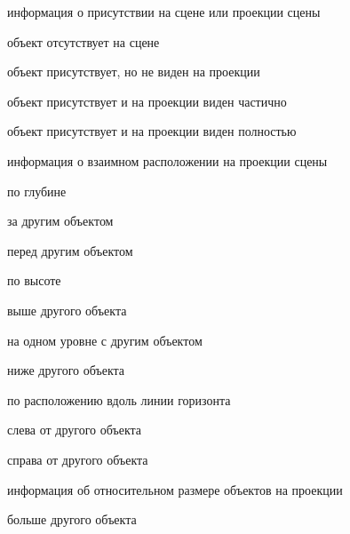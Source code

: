 \begin{textitemize}
    \item информация о присутствии на сцене или проекции сцены
    \begin{textitemize}
        \item объект отсутствует на сцене
        \item объект присутствует, но не виден на проекции
        \item объект присутствует и на проекции виден частично
        \item объект присутствует и на проекции виден полностью
    \end{textitemize}
    \item информация о взаимном расположении на проекции сцены
    \begin{textitemize}
        \item по глубине
        \begin{textitemize}
            \item за другим объектом
            \item перед другим объектом
        \end{textitemize}
    \end{textitemize}
    \begin{textitemize}
        \item по высоте
        \begin{textitemize}
            \item выше другого объекта
            \item на одном уровне с другим объектом
            \item ниже другого объекта
        \end{textitemize}
    \end{textitemize}
    \begin{textitemize}
        \item по расположению вдоль линии горизонта
        \begin{textitemize}
            \item слева от другого объекта
            \item справа от другого объекта
        \end{textitemize}
    \end{textitemize}
    \item информация об относительном размере объектов на проекции
    \begin{textitemize}
        \item больше другого объекта

\end{textitemize}
\end{textitemize}
